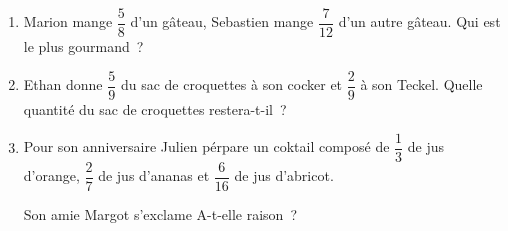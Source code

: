\documentclass{article}
\begin{document}
\long{}
\begin{enumerate}
    \item Marion mange $\dfrac58$ d'un gâteau, Sebastien mange $\dfrac7{12}$
    d'un autre gâteau. Qui est le plus gourmand~?
    \item Ethan donne $\dfrac59$ du sac de croquettes à son cocker et
    $\dfrac29$ à son Teckel. Quelle quantité du sac de croquettes restera-t-il~?
    \item Pour son anniversaire Julien pérpare un coktail composé de
    $\dfrac13$ de jus d'orange, $\dfrac27$ de jus d'ananas et $\dfrac6{16}$
    de jus d'abricot. \medskip\par\noindent Son amie Margot s'exclame 
    A-t-elle raison~?
\end{enumerate}
\end{document}
